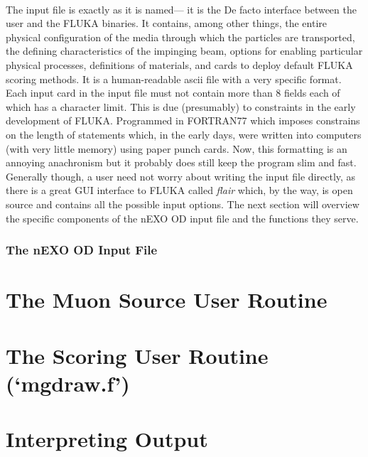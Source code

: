 \documentclass[10pt]{article}
\begin{document}
    \paragraph{}
    The input file is exactly as it is named— it is the De facto interface between the user and the FLUKA binaries. It contains, among other things, the entire physical configuration of the media through which the particles are transported, the defining characteristics of the impinging beam, options for enabling particular physical processes, definitions of materials, and cards to deploy default FLUKA scoring methods. It is a human-readable ascii file with a very specific format. Each input card in the input file must not contain more than 8 fields each of which has a character limit. This is due (presumably) to constraints in the early development of FLUKA. Programmed in FORTRAN77 which imposes constrains on the length of statements which, in the early days, were written into computers (with very little memory) using paper punch cards. Now, this formatting is an annoying anachronism but it probably does still keep the program slim and fast. Generally though, a user need not worry about writing the input file directly, as there is a great GUI interface to FLUKA called \textit{flair} which, by the way, is open source and contains all the possible input options. The next section will overview the specific components of the nEXO OD input file and the functions they serve.


\section{The nEXO OD Input File}






\part*{The Muon Source User Routine}

\part*{The Scoring User Routine (`mgdraw.f')}

\part*{Interpreting Output}

\clearpage
\appendixheaderon
\appendixpage
\begin{appendices}



\end{appendices}





% 
% 
\end{document}
